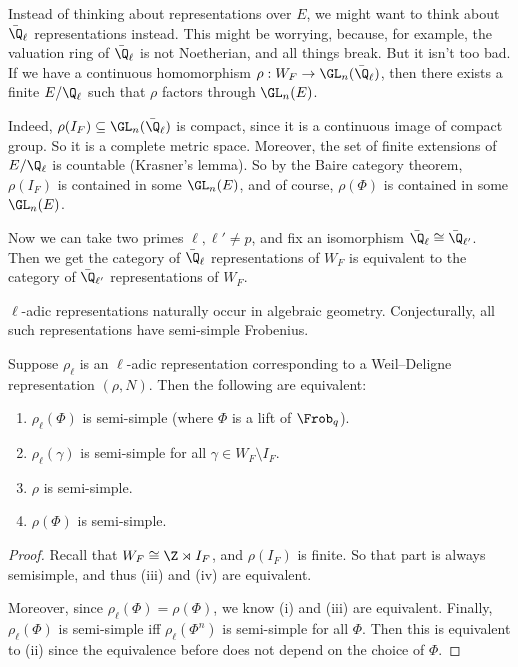 \documentclass[a4paper]{article}
\begin{document}
Instead of thinking about representations over $E$, we might want to think about $\bar{\Q}_\ell$ representations instead. This might be worrying, because, for example, the valuation ring of $\bar{\Q}_\ell$ is not Noetherian, and all things break. But it isn't too bad. If we have a continuous homomorphism $\rho: W_F \to \GL_n(\bar{\Q}_\ell)$, then there exists a finite $E/\Q_\ell$ such that $\rho$ factors through $\GL_n(E)$.

Indeed, $\rho(I_F) \subseteq \GL_n(\bar{\Q}_\ell)$ is compact, since it is a continuous image of compact group. So it is a complete metric space. Moreover, the set of finite extensions of $E/\Q_\ell$ is countable (Krasner's lemma). So by the Baire category theorem, $\rho(I_F)$ is contained in some $\GL_n(E)$, and of course, $\rho(\Phi)$ is contained in some $\GL_n(E)$.

Now we can take two primes $\ell, \ell' \not= p$, and fix an isomorphism $\bar{\Q}_\ell \cong \bar{\Q}_{\ell'}$. Then we get the category of $\bar{\Q}_\ell$ representations of $W_F$ is equivalent to the category of $\bar{\Q}_{\ell'}$ representations of $W_F$.

$\ell$-adic representations naturally occur in algebraic geometry. Conjecturally, all such representations have semi-simple Frobenius.
\begin{prop}
  Suppose $\rho_\ell$ is an $\ell$-adic representation corresponding to a Weil--Deligne representation $(\rho, N)$. Then the following are equivalent:
  \begin{enumerate}
    \item $\rho_\ell(\Phi)$ is semi-simple (where $\Phi$ is a lift of $\Frob_q$).
    \item $\rho_\ell(\gamma)$ is semi-simple for all $\gamma \in W_F \setminus I_F$.
    \item $\rho$ is semi-simple.
    \item $\rho(\Phi)$ is semi-simple.
  \end{enumerate}
\end{prop}
\begin{proof}
  Recall that $W_F \cong \Z \rtimes I_F$, and $\rho(I_F)$ is finite. So that part is always semisimple, and thus (iii) and (iv) are equivalent.

  Moreover, since $\rho_\ell(\Phi) = \rho(\Phi)$, we know (i) and (iii) are equivalent. Finally, $\rho_\ell(\Phi)$ is semi-simple iff $\rho_\ell(\Phi^n)$ is semi-simple for all $\Phi$. Then this is equivalent to (ii) since the equivalence before does not depend on the choice of $\Phi$.
\end{proof}
\end{document}

